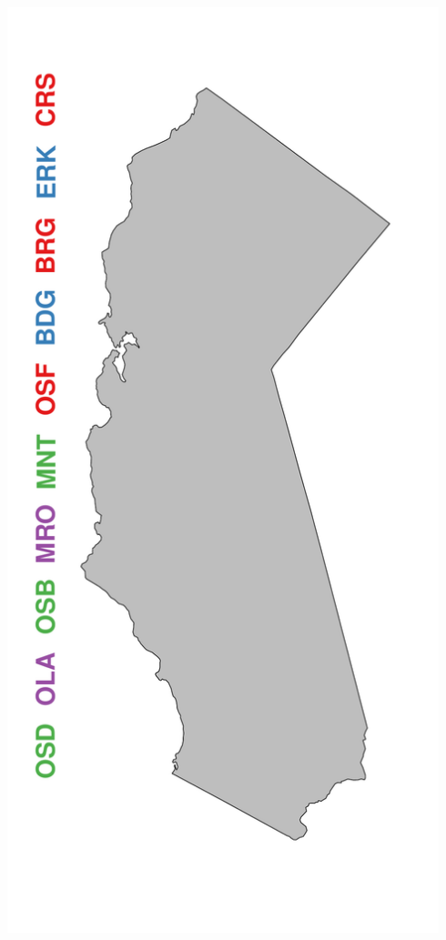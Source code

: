 \documentclass[a0paper,portrait]{baposter}
\begin{document}
\begin{poster}
{\begin{minipage}[h!]{0.19\textwidth}
	        \includegraphics[width=0.94\textwidth]{../pictures/mapLeapFrog.pdf}
	\end{minipage}
	\begin{minipage}[h!]{0.19\textwidth}
	        \hspace*{0.25cm}

\end{minipage}}
\end{poster}
\end{document}
